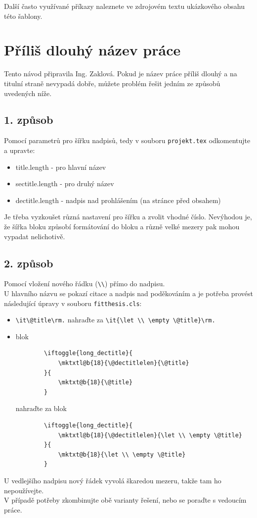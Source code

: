 Další často využívané příkazy naleznete ve zdrojovém textu ukázkového obsahu této šablony.



\newcommand{\odradkovani}{\\[0.3em]}

\chapter{Příliš dlouhý název práce}
Tento návod připravila Ing. Zaklová. Pokud je název práce příliš dlouhý a na titulní straně nevypadá dobře, můžete problém řešit jedním ze způsobů uvedených níže.

\section{1. způsob}
Pomocí parametrů pro šířku nadpisů, tedy v souboru \texttt{projekt.tex} odkomentujte a upravte:
\begin{itemize}
	\item title.length - pro hlavní název
 	\item sectitle.length - pro druhý název
 	\item dectitle.length - nadpis nad prohlášením (na stránce před obsahem)  
\end{itemize}

Je třeba vyzkoušet různá nastavení pro šířku a zvolit vhodné číslo. Nevýhodou je, že šířka bloku způsobí formátování do bloku a různě velké mezery pak mohou vypadat nelichotivě.

\section{2. způsob}
Pomocí vložení nového řádku (\verb|\\|) přímo do nadpisu. \\

U hlavního názvu se pokazí citace a nadpis nad poděkováním a je potřeba provést následující úpravy v souboru \texttt{fitthesis.cls}:
\begin{itemize}
	\item \verb|\it\@title\rm.| nahraďte za \verb|\it{\let \\ \empty \@title}\rm.|
	\item blok
	\begin{verbatim}		\iftoggle{long_dectitle}{
			\mktxtl@b{18}{\@dectitlelen}{\@title}
		}{
			\mktxt@b{18}{\@title}
		}		
	\end{verbatim}
	nahraďte za blok
	\begin{verbatim}
		\iftoggle{long_dectitle}{
			\mktxtl@b{18}{\@dectitlelen}{\let \\ \empty \@title}
		}{
			\mktxt@b{18}{\let \\ \empty \@title}
		}
	\end{verbatim}
\end{itemize}
U vedlejšího nadpisu nový řádek vyvolá škaredou mezeru, takže tam ho nepoužívejte. 
\\ \noindent V případě potřeby zkombinujte obě varianty řešení, nebo se poraďte s vedoucím práce.



